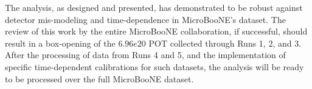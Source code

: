

\par The analysis, as designed and presented, has demonstrated to be robust against detector mis-modeling and time-dependence in MicroBooNE's dataset. The review of this work by the entire MicroBooNE collaboration, if successful, should result in a box-opening of the $6.96e20$ POT collected through Runs 1, 2, and 3. After the processing of data from Runs 4 and 5, and the implementation of specific time-dependent calibrations for such datasets, the analysis will be ready to be processed over the full MicroBooNE dataset.

